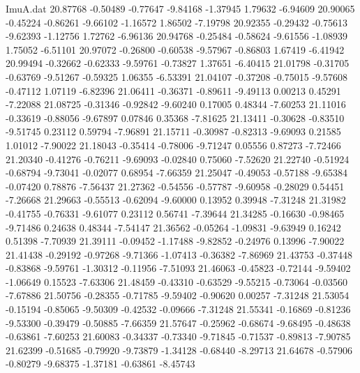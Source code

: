 \begin{filecontents}{ImuA.dat}
  20.87768   -0.50489   -0.77647   -9.84168   -1.37945    1.79632   -6.94609
  20.90065   -0.45224   -0.86261   -9.66102   -1.16572    1.86502   -7.19798
  20.92355   -0.29432   -0.75613   -9.62393   -1.12756    1.72762   -6.96136
  20.94768   -0.25484   -0.58624   -9.61556   -1.08939    1.75052   -6.51101
  20.97072   -0.26800   -0.60538   -9.57967   -0.86803    1.67419   -6.41942
  20.99494   -0.32662   -0.62333   -9.59761   -0.73827    1.37651   -6.40415
  21.01798   -0.31705   -0.63769   -9.51267   -0.59325    1.06355   -6.53391
  21.04107   -0.37208   -0.75015   -9.57608   -0.47112    1.07119   -6.82396
  21.06411   -0.36371   -0.89611   -9.49113    0.00213    0.45291   -7.22088
  21.08725   -0.31346   -0.92842   -9.60240    0.17005    0.48344   -7.60253
  21.11016   -0.33619   -0.88056   -9.67897    0.07846    0.35368   -7.81625
  21.13411   -0.30628   -0.83510   -9.51745    0.23112    0.59794   -7.96891
  21.15711   -0.30987   -0.82313   -9.69093    0.21585    1.01012   -7.90022
  21.18043   -0.35414   -0.78006   -9.71247    0.05556    0.87273   -7.72466
  21.20340   -0.41276   -0.76211   -9.69093   -0.02840    0.75060   -7.52620
  21.22740   -0.51924   -0.68794   -9.73041   -0.02077    0.68954   -7.66359
  21.25047   -0.49053   -0.57188   -9.65384   -0.07420    0.78876   -7.56437
  21.27362   -0.54556   -0.57787   -9.60958   -0.28029    0.54451   -7.26668
  21.29663   -0.55513   -0.62094   -9.60000    0.13952    0.39948   -7.31248
  21.31982   -0.41755   -0.76331   -9.61077    0.23112    0.56741   -7.39644
  21.34285   -0.16630   -0.98465   -9.71486    0.24638    0.48344   -7.54147
  21.36562   -0.05264   -1.09831   -9.63949    0.16242    0.51398   -7.70939
  21.39111   -0.09452   -1.17488   -9.82852   -0.24976    0.13996   -7.90022
  21.41438   -0.29192   -0.97268   -9.71366   -1.07413   -0.36382   -7.86969
  21.43753   -0.37448   -0.83868   -9.59761   -1.30312   -0.11956   -7.51093
  21.46063   -0.45823   -0.72144   -9.59402   -1.06649    0.15523   -7.63306
  21.48459   -0.43310   -0.63529   -9.55215   -0.73064   -0.03560   -7.67886
  21.50756   -0.28355   -0.71785   -9.59402   -0.90620    0.00257   -7.31248
  21.53054   -0.15194   -0.85065   -9.50309   -0.42532   -0.09666   -7.31248
  21.55341   -0.16869   -0.81236   -9.53300   -0.39479   -0.50885   -7.66359
  21.57647   -0.25962   -0.68674   -9.68495   -0.48638   -0.63861   -7.60253
  21.60083   -0.34337   -0.73340   -9.71845   -0.71537   -0.89813   -7.90785
  21.62399   -0.51685   -0.79920   -9.73879   -1.34128   -0.68440   -8.29713
  21.64678   -0.57906   -0.80279   -9.68375   -1.37181   -0.63861   -8.45743

\end{filecontents}
